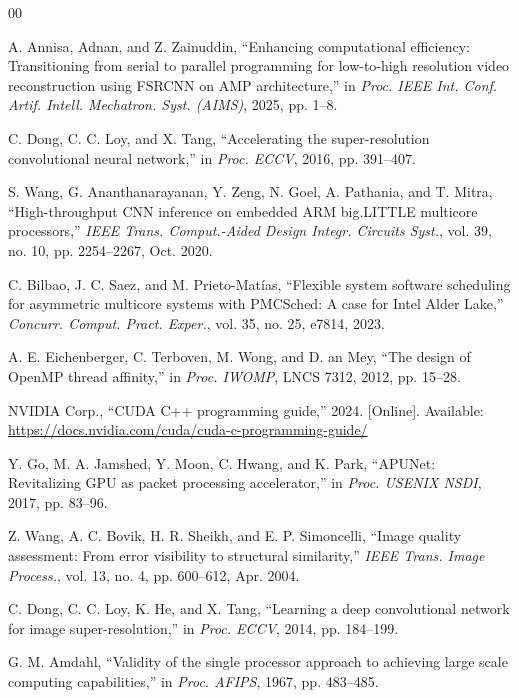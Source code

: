 \documentclass[conference]{IEEEtran}
\begin{document}
\begin{thebibliography}{00}
\footnotesize
\setlength{\itemsep}{0pt plus 0.2pt}

 A. Annisa, Adnan, and Z. Zainuddin, ``Enhancing computational efficiency: Transitioning from serial to parallel programming for low-to-high resolution video reconstruction using FSRCNN on AMP architecture,'' in \emph{Proc. IEEE Int. Conf. Artif. Intell. Mechatron. Syst. (AIMS)}, 2025, pp. 1--8.

 C. Dong, C. C. Loy, and X. Tang, ``Accelerating the super-resolution convolutional neural network,'' in \emph{Proc. ECCV}, 2016, pp. 391--407.

 S. Wang, G. Ananthanarayanan, Y. Zeng, N. Goel, A. Pathania, and T. Mitra, ``High-throughput CNN inference on embedded ARM big.LITTLE multicore processors,'' \emph{IEEE Trans. Comput.-Aided Design Integr. Circuits Syst.}, vol. 39, no. 10, pp. 2254--2267, Oct. 2020.

 C. Bilbao, J. C. Saez, and M. Prieto-Mat\'ias, ``Flexible system software scheduling for asymmetric multicore systems with PMCSched: A case for Intel Alder Lake,'' \emph{Concurr. Comput. Pract. Exper.}, vol. 35, no. 25, e7814, 2023.

 A. E. Eichenberger, C. Terboven, M. Wong, and D. an Mey, ``The design of OpenMP thread affinity,'' in \emph{Proc. IWOMP}, LNCS 7312, 2012, pp. 15--28.

 NVIDIA Corp., ``CUDA C++ programming guide,'' 2024. [Online]. Available: \url{https://docs.nvidia.com/cuda/cuda-c-programming-guide/}

 Y. Go, M. A. Jamshed, Y. Moon, C. Hwang, and K. Park, ``APUNet: Revitalizing GPU as packet processing accelerator,'' in \emph{Proc. USENIX NSDI}, 2017, pp. 83--96.

 Z. Wang, A. C. Bovik, H. R. Sheikh, and E. P. Simoncelli, ``Image quality assessment: From error visibility to structural similarity,'' \emph{IEEE Trans. Image Process.}, vol. 13, no. 4, pp. 600--612, Apr. 2004.

 C. Dong, C. C. Loy, K. He, and X. Tang, ``Learning a deep convolutional network for image super-resolution,'' in \emph{Proc. ECCV}, 2014, pp. 184--199.

 G. M. Amdahl, ``Validity of the single processor approach to achieving large scale computing capabilities,'' in \emph{Proc. AFIPS}, 1967, pp. 483--485.


\end{thebibliography}
\end{document}
